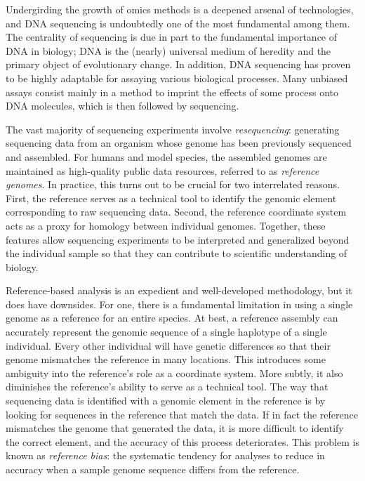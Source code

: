 \documentclass[11pt]{ucthesis}
\begin{document}
Undergirding the growth of omics methods is a deepened arsenal of technologies, and DNA sequencing is undoubtedly one of the most fundamental among them. The centrality of sequencing is due in part to the fundamental importance of DNA in biology; DNA is the (nearly) universal medium of heredity and the primary object of evolutionary change. In addition, DNA sequencing has proven to be highly adaptable for assaying various biological processes. Many unbiased assays consist mainly in a method to imprint the effects of some process onto DNA molecules, which is then followed by sequencing. 

The vast majority of sequencing experiments involve \emph{resequencing}: generating sequencing data from an organism whose genome has been previously sequenced and assembled. For humans and model species, the assembled genomes are maintained as high-quality public data resources, referred to as \emph{reference genomes}. In practice, this turns out to be crucial for two interrelated reasons. First, the reference serves as a technical tool to identify the genomic element corresponding to raw sequencing data. Second, the reference coordinate system acts as a proxy for homology between individual genomes. Together, these features allow sequencing experiments to be interpreted and generalized beyond the individual sample so that they can contribute to scientific understanding of biology.

Reference-based analysis is an expedient and well-developed methodology, but it does have downsides. For one, there is a fundamental limitation in using a single genome as a reference for an entire species. At best, a reference assembly can accurately represent the genomic sequence of a single haplotype of a single individual. Every other individual will have genetic differences so that their genome mismatches the reference in many locations. This introduces some ambiguity into the reference's role as a coordinate system. More subtly, it also diminishes the reference's ability to serve as a technical tool. The way that sequencing data is identified with a genomic element in the reference is by looking for sequences in the reference that match the data. If in fact the reference mismatches the genome that generated the data, it is more difficult to identify the correct element, and the accuracy of this process deteriorates. This problem is known as \emph{reference bias}: the systematic tendency for analyses to reduce in accuracy when a sample genome sequence differs from the reference. 
\end{document}
